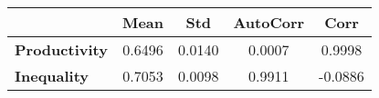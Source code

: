 \begin{tiny}\begin{tabular}{|l|c|c|c|c|}
\hline
&\textbf{Mean}&\textbf{Std}&\textbf{AutoCorr}&\textbf{Corr}\\\hline
\textbf{Productivity}&0.6496&0.0140&0.0007&0.9998\\\hline
\textbf{Inequality}&0.7053&0.0098&0.9911&-0.0886\\\hline
\end{tabular}
\end{tiny}